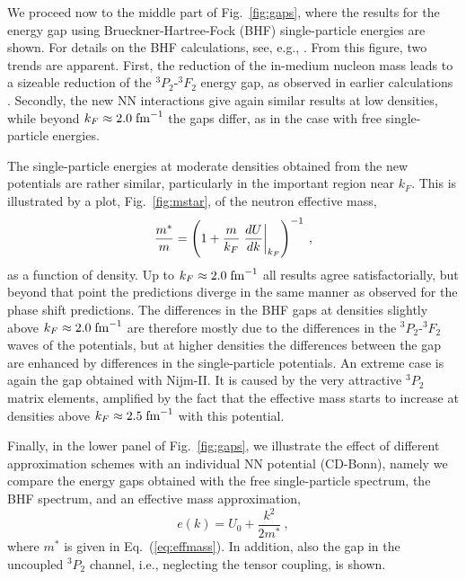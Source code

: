 \documentclass[rmp,aps,floatfix]{revtex4}
\begin{document}
We proceed now to the middle part of Fig.~\ref{fig:gaps}, where
the results for the energy gap using Brueckner-Hartree-Fock (BHF) 
single-particle energies are shown.  
For details on the BHF calculations, see, e.g., \cite{jjm76}.  
From this figure, two trends are apparent.
First, the reduction of the in-medium nucleon mass leads to a sizeable 
reduction of the $^3P_2$-$^3F_2$ energy gap, as observed in 
earlier calculations \cite{amu85,bcll92,taka93,elga96}.  
Secondly, the new NN interactions give again similar results 
at low densities, while beyond $k_F\approx 2.0\;{\rm fm}^{-1}$ 
the gaps differ, as in the case with free single-particle energies.   

The single-particle energies at moderate densities obtained from the 
new potentials are rather similar, particularly in the 
important region near $k_F$.  
This is illustrated by a plot, Fig.~\ref{fig:mstar},
of the neutron effective mass,
\begin{equation}
 {m^*\over m} = \left( 1 + {m\over k_F} 
 \left.{dU\over dk}\right|_{k_F} \right)^{-1} \:,
\label{eq:effmass}
\end{equation}
as a function of density.
Up to $k_F \approx 2.0\;{\rm fm}^{-1}$ all results agree satisfactorially,
but beyond that point the predictions diverge in the same manner as observed
for the phase shift predictions.
The differences in the BHF gaps at densities slightly above  
$k_F\approx 2.0\;{\rm fm}^{-1}$ are therefore mostly 
due to the differences in the $^3P_2$-$^3F_2$ waves of the potentials,
but at higher densities the differences between the gap are enhanced 
by differences in the single-particle potentials.
An extreme case is again the gap obtained with Nijm-II.  
It is caused by the very attractive $^3P_2$ matrix elements, 
amplified by the fact that the effective mass 
starts to increase at densities above $k_F\approx 2.5\;{\rm fm}^{-1}$ 
with this potential.  



Finally, in the lower panel of Fig.~\ref{fig:gaps}, we illustrate the
effect of different approximation schemes with an individual NN potential
(CD-Bonn), namely we compare the energy gaps obtained 
with the free single-particle spectrum, the BHF spectrum,
and an effective mass approximation,
\begin{equation}
  e(k) = U_0 + \frac{k^2}{2m^*} \:,
\label{eq:mstarapp}
\end{equation}
where $m^*$ is given in Eq.~(\ref{eq:effmass}).
In addition, also the gap in the uncoupled $^3P_2$ channel, 
i.e., neglecting the tensor coupling, is shown.
\end{document}
